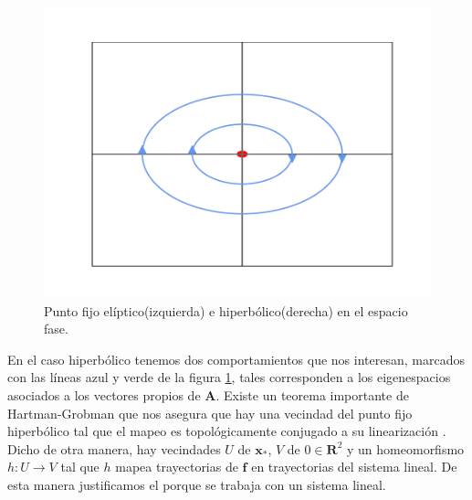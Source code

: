 \begin{figure}[h!]
\centering
\includegraphics[scale=0.3]{hyperbolic} 
\caption{Punto fijo elíptico(izquierda) e hiperbólico(derecha) en el espacio fase.}
\label{hiperbolic}
\end{figure}



En el caso hiperbólico tenemos dos comportamientos que nos interesan, marcados con las líneas azul y verde de la figura \ref{hiperbolic}, tales corresponden a los eigenespacios asociados a los vectores propios de $\mathbf{A}$. Existe un teorema importante de Hartman-Grobman que nos asegura que hay una vecindad del punto fijo hiperbólico tal que el mapeo es topológicamente conjugado a su linearización \cite{Meiss,Meyer,Juergen}. Dicho de otra manera, hay vecindades $U$ de $\mathbf{x}_{*}$, $V$ de $0 \in \mathbf{R}^{2}$ y un homeomorfismo $h:U\rightarrow V$ tal que $h$ mapea trayectorias de $\mathbf{f}$ en trayectorias del sistema lineal. De esta manera justificamos el porque se trabaja con un sistema lineal.



